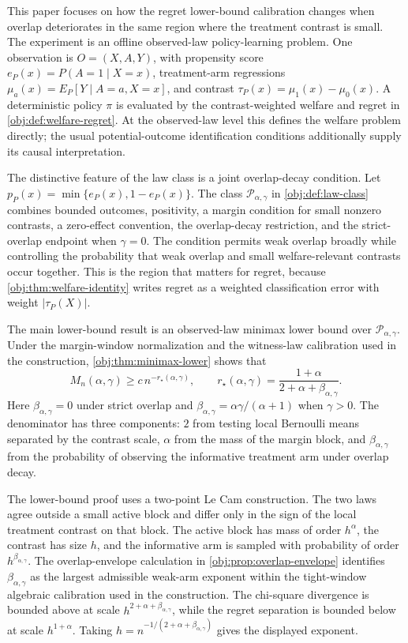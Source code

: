 \documentclass[11pt]{article}
\begin{document}
This paper focuses on how the regret lower-bound calibration changes when overlap deteriorates in the same region where the treatment contrast is small.  The experiment is an offline observed-law policy-learning problem.  One observation is \(O=(X,A,Y)\), with propensity score \(e_P(x)=P(A=1\mid X=x)\), treatment-arm regressions \(\mu_a(x)=E_P[Y\mid A=a,X=x]\), and contrast \(\tau_P(x)=\mu_1(x)-\mu_0(x)\).  A deterministic policy \(\pi\) is evaluated by the contrast-weighted welfare and regret in \cref{obj:def:welfare-regret}.  At the observed-law level this defines the welfare problem directly; the usual potential-outcome identification conditions additionally supply its causal interpretation.

The distinctive feature of the law class is a joint overlap-decay condition.  Let \(p_P(x)=\min\{e_P(x),1-e_P(x)\}\).  The class \(\mathcal P_{\alpha,\gamma}\) in \cref{obj:def:law-class} combines bounded outcomes, positivity, a margin condition for small nonzero contrasts, a zero-effect convention, the overlap-decay restriction, and the strict-overlap endpoint when \(\gamma=0\).  The condition permits weak overlap broadly while controlling the probability that weak overlap and small welfare-relevant contrasts occur together.  This is the region that matters for regret, because \cref{obj:thm:welfare-identity} writes regret as a weighted classification error with weight \(|\tau_P(X)|\).

The main lower-bound result is an observed-law minimax lower bound over \(\mathcal P_{\alpha,\gamma}\).  Under the margin-window normalization and the witness-law calibration used in the construction, \cref{obj:thm:minimax-lower} shows that
\[
M_n(\alpha,\gamma)\ge c\,n^{-r_\star(\alpha,\gamma)},
\qquad
r_\star(\alpha,\gamma)
=
\frac{1+\alpha}{2+\alpha+\beta_{\alpha,\gamma}} .
\]
Here \(\beta_{\alpha,\gamma}=0\) under strict overlap and \(\beta_{\alpha,\gamma}=\alpha\gamma/(\alpha+1)\) when \(\gamma>0\).  The denominator has three components: \(2\) from testing local Bernoulli means separated by the contrast scale, \(\alpha\) from the mass of the margin block, and \(\beta_{\alpha,\gamma}\) from the probability of observing the informative treatment arm under overlap decay.

The lower-bound proof uses a two-point Le Cam construction.  The two laws agree outside a small active block and differ only in the sign of the local treatment contrast on that block.  The active block has mass of order \(h^\alpha\), the contrast has size \(h\), and the informative arm is sampled with probability of order \(h^{\beta_{\alpha,\gamma}}\).  The overlap-envelope calculation in \cref{obj:prop:overlap-envelope} identifies \(\beta_{\alpha,\gamma}\) as the largest admissible weak-arm exponent within the tight-window algebraic calibration used in the construction.  The chi-square divergence is bounded above at scale \(h^{2+\alpha+\beta_{\alpha,\gamma}}\), while the regret separation is bounded below at scale \(h^{1+\alpha}\).  Taking \(h=n^{-1/(2+\alpha+\beta_{\alpha,\gamma})}\) gives the displayed exponent.
\end{document}
